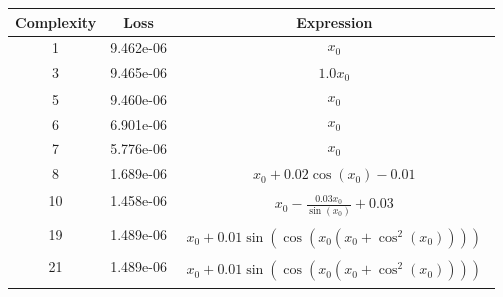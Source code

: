 \begin{center}
        \begin{tabular}{|c|c|c|}
        \hline
        Complexity & Loss & Expression \\
        \hline
        1 & 9.462e-06 & $\begin{aligned}x_{0}\end{aligned}$\\ \hline3 & 9.465e-06 & $\begin{aligned}1.0 x_{0}\end{aligned}$\\ \hline5 & 9.460e-06 & $\begin{aligned}x_{0}\end{aligned}$\\ \hline6 & 6.901e-06 & $\begin{aligned}x_{0}\end{aligned}$\\ \hline7 & 5.776e-06 & $\begin{aligned}x_{0}\end{aligned}$\\ \hline8 & 1.689e-06 & $\begin{aligned}x_{0} + 0.02 \cos{\left(x_{0} \right)} - 0.01\end{aligned}$\\ \hline10 & 1.458e-06 & $\begin{aligned}x_{0} - \frac{0.03 x_{0}}{\sin{\left(x_{0} \right)}} + 0.03\end{aligned}$\\ \hline19 & 1.489e-06 & $\begin{aligned}x_{0} + 0.01 \sin{\left(\cos{\left(x_{0} \left(x_{0} + \cos^{2}{\left(x_{0} \right)}\right) \right)} \right)}\end{aligned}$\\ \hline21 & 1.489e-06 & $\begin{aligned}x_{0} + 0.01 \sin{\left(\cos{\left(x_{0} \left(x_{0} + \cos^{2}{\left(x_{0} \right)}\right) \right)} \right)}\end{aligned}$\\ \hline\end{tabular}
        \end{center}
        